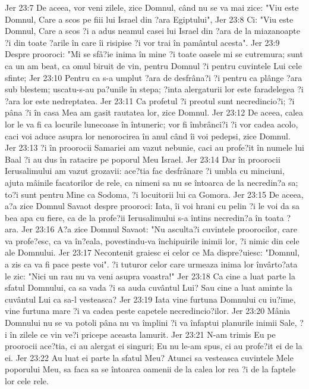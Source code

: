 Jer 23:7  De aceea, vor veni zilele, zice Domnul, când nu se va mai zice: "Viu este Domnul, Care a scos pe fiii lui Israel din ?ara Egiptului",
Jer 23:8  Ci: "Viu este Domnul, Care a scos ?i a adus neamul casei lui Israel din ?ara de la miazanoapte ?i din toate ?arile în care îi risipise ?i vor trai în pamântul acesta".
Jer 23:9  Despre prooroci: "Mi se sfâ?ie inima în mine ?i toate oasele mi se cutremura; sunt ca un am beat, ca omul biruit de vin, pentru Domnul ?i pentru cuvintele Lui cele sfinte;
Jer 23:10  Pentru ca s-a umplut ?ara de desfrâna?i ?i pentru ca plânge ?ara sub blestem; uscatu-s-au pa?unile în stepa; ?inta alergaturii lor este faradelegea ?i ?ara lor este nedreptatea.
Jer 23:11  Ca profetul ?i preotul sunt necredincio?i; ?i pâna ?i în casa Mea am gasit rautatea lor, zice Domnul.
Jer 23:12  De aceea, calea lor le va fi ca locurile lunecoase în întuneric; vor fi îmbrânci?i ?i vor cadea acolo, caci voi aduce asupra lor nenorocirea în anul când îi voi pedepsi, zice Domnul.
Jer 23:13  ?i în proorocii Samariei am vazut nebunie, caci au profe?it în numele lui Baal ?i au dus în ratacire pe poporul Meu Israel.
Jer 23:14  Dar în proorocii Ierusalimului am vazut grozavii: ace?tia fac desfrânare ?i umbla cu minciuni, ajuta mâinile facatorilor de rele, ca nimeni sa nu se întoarca de la necredin?a sa; to?i sunt pentru Mine ca Sodoma, ?i locuitorii lui ca Gomora.
Jer 23:15  De aceea, a?a zice Domnul Savaot despre prooroci: Iata, îi voi hrani cu pelin ?i le voi da sa bea apa cu fiere, ca de la profe?ii Ierusalimului s-a întins necredin?a în toata ?ara.
Jer 23:16  A?a zice Domnul Savaot: "Nu asculta?i cuvintele proorocilor, care va profe?esc, ca va în?eala, povestindu-va închipuirile inimii lor, ?i nimic din cele ale Domnului.
Jer 23:17  Necontenit graiesc ei celor ce Ma dispre?uiesc: "Domnul, a zis ca va fi pace peste voi". ?i tuturor celor care urmeaza inima lor învârto?ata le zic: "Nici un rau nu va veni asupra voastra!"
Jer 23:18  Ca cine a luat parte la sfatul Domnului, ca sa vada ?i sa auda cuvântul Lui? Sau cine a luat aminte la cuvântul Lui ca sa-l vesteasca?
Jer 23:19  Iata vine furtuna Domnului cu iu?ime, vine furtuna mare ?i va cadea peste capetele necredincio?ilor.
Jer 23:20  Mânia Domnului nu se va potoli pâna nu va împlini ?i va înfaptui planurile inimii Sale, ?i în zilele ce vin ve?i pricepe aceasta lamurit.
Jer 23:21  N-am trimis Eu pe proorocii ace?tia, ci au alergat ei singuri; Eu nu le-am spus, ci au profe?it ei de la ei.
Jer 23:22  Au luat ei parte la sfatul Meu? Atunci sa vesteasca cuvintele Mele poporului Meu, sa faca sa se întoarca oamenii de la calea lor rea ?i de la faptele lor cele rele.
